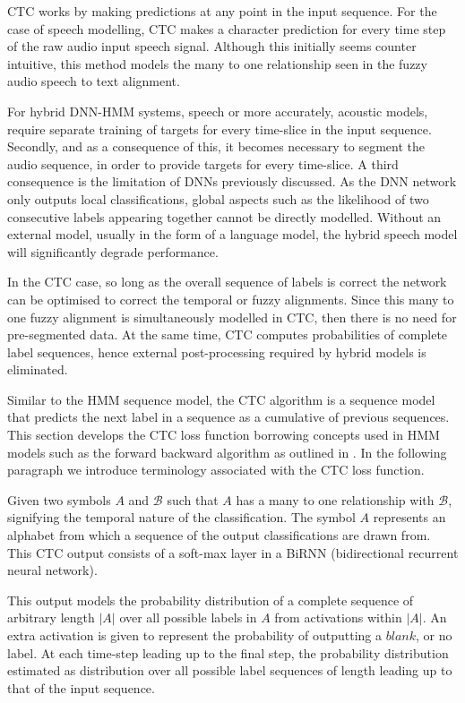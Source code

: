 CTC works by making predictions at any point in the input sequence. For the case of speech modelling,  CTC makes a character prediction for every time step of the raw audio input speech signal. Although this initially seems counter intuitive, this method models the many to one relationship seen in the fuzzy audio speech to text alignment. 

For hybrid DNN-HMM systems, speech or more accurately, acoustic models, require separate training of targets for every time-slice in the input sequence. Secondly, and  as a consequence of this, it becomes necessary to segment the audio sequence, in order to provide targets for every time-slice. A third consequence is the limitation of DNNs previously discussed. As the DNN network only outputs local classifications, global aspects such as the likelihood of two consecutive labels appearing together cannot be directly modelled.  Without an external model, usually in the form of a language model, the hybrid speech model will significantly degrade performance.

In the CTC case, so long as the overall sequence of labels is correct the network can be optimised to correct the temporal or fuzzy alignments. Since this many to one fuzzy alignment is simultaneously modelled in CTC, then there is no need for pre-segmented data. At the same time, CTC computes probabilities of complete label sequences, hence external post-processing required by hybrid models is eliminated.

Similar to the HMM sequence model, the CTC algorithm is a sequence model that predicts the next label in a sequence as a cumulative of previous sequences.  This section develops the CTC loss function borrowing concepts used in HMM models such as the forward backward algorithm as outlined in \citep{graves2006connectionist}.  In the following paragraph we introduce terminology associated with the CTC loss function.

Given two symbols $A$ and $\mathcal{B}$ such that $A$ has a many to one relationship with $\mathcal{B}$, signifying the temporal nature of the classification. The symbol $A$ represents an alphabet from which a sequence of the output classifications are drawn from. This CTC output consists of a soft-max layer in a BiRNN (bidirectional recurrent neural network). 

This output models the probability distribution of a complete sequence of arbitrary length $|A|$ over all possible labels in $A$ from activations within $|A|$. An extra activation is given to represent the probability of outputting a $blank$, or no label. At each time-step leading up to the final step, the probability distribution estimated as distribution over all possible label sequences of length leading up to that of the input sequence.

